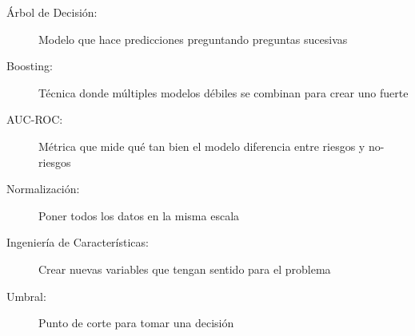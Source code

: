 \documentclass[11pt,a4paper,spanish]{article}
\begin{document}
\begin{description}
    \item[Árbol de Decisión:] Modelo que hace predicciones preguntando preguntas sucesivas
    \item[Boosting:] Técnica donde múltiples modelos débiles se combinan para crear uno fuerte
    \item[AUC-ROC:] Métrica que mide qué tan bien el modelo diferencia entre riesgos y no-riesgos
    \item[Normalización:] Poner todos los datos en la misma escala
    \item[Ingeniería de Características:] Crear nuevas variables que tengan sentido para el problema
    \item[Umbral:] Punto de corte para tomar una decisión
\end{description}
\end{document}
